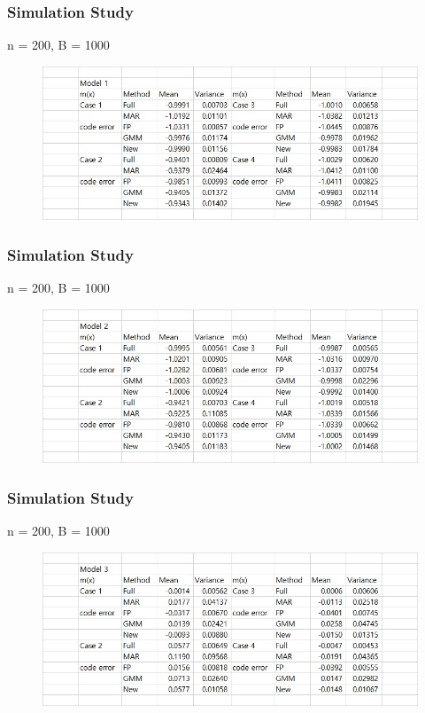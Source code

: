 \documentclass{beamer}
\begin{document}
\begin{frame}
\frametitle{Simulation Study}
\centerline{n = 200, B = 1000}
\begin{figure}
\includegraphics[width=1\linewidth]{res1.jpg}
\end{figure}
\end{frame}
\begin{frame}
\frametitle{Simulation Study}
\centerline{n = 200, B = 1000}
\begin{figure}
\includegraphics[width=1\linewidth]{res2.jpg}
\end{figure}
\end{frame}
\begin{frame}
\frametitle{Simulation Study}
\centerline{n = 200, B = 1000}
\begin{figure}
\includegraphics[width=1\linewidth]{res3.jpg}
\end{figure}
\end{frame}
\end{document}

